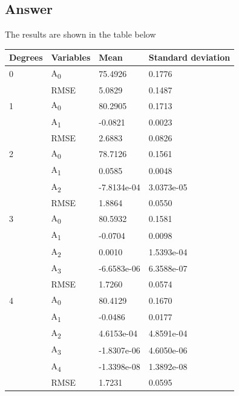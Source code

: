 \documentclass[
	12pt, %
]{fphw}
\begin{document}

\subsection*{Answer}

The results are shown in the table below
\begin{longtable}[h]{@{}llll@{}}
	\toprule
	Degrees & Variables & Mean & Standard deviation\tabularnewline
	\midrule
	\endhead
	0 & A\textsubscript{0} & 75.4926 & 0.1776\tabularnewline
	& RMSE & 5.0829 & 0.1487\tabularnewline
	1 & A\textsubscript{0} & 80.2905 & 0.1713\tabularnewline
	& A\textsubscript{1} & -0.0821 & 0.0023\tabularnewline
	& RMSE & 2.6883 & 0.0826\tabularnewline
	2 & A\textsubscript{0} & 78.7126 & 0.1561\tabularnewline
	& A\textsubscript{1} & 0.0585 & 0.0048\tabularnewline
	& A\textsubscript{2} & -7.8134e-04 & 3.0373e-05\tabularnewline
	& RMSE & 1.8864 & 0.0550\tabularnewline
	3 & A\textsubscript{0} & 80.5932 & 0.1581\tabularnewline
	& A\textsubscript{1} & -0.0704 & 0.0098\tabularnewline
	& A\textsubscript{2} & 0.0010 & 1.5393e-04\tabularnewline
	& A\textsubscript{3} & -6.6583e-06 & 6.3588e-07\tabularnewline
	& RMSE & 1.7260 & 0.0574\tabularnewline
	4 & A\textsubscript{0} & 80.4129 & 0.1670\tabularnewline
	& A\textsubscript{1} & -0.0486 & 0.0177\tabularnewline
	& A\textsubscript{2} & 4.6153e-04 & 4.8591e-04\tabularnewline
	& A\textsubscript{3} & -1.8307e-06 & 4.6050e-06\tabularnewline
	& A\textsubscript{4} & -1.3398e-08 & 1.3892e-08\tabularnewline
	& RMSE & 1.7231 & 0.0595\tabularnewline
	\bottomrule
\end{longtable}
\end{document}
